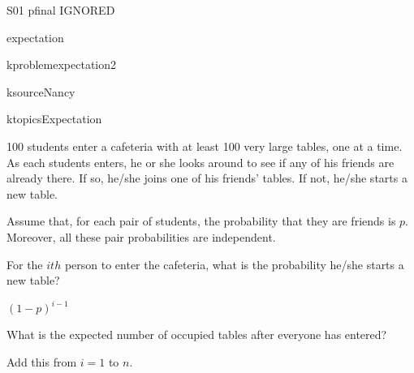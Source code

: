 \begin{problem}
\begin{staffnotes}
S01 pfinal IGNORED

expectation

kproblem{expectation2}

ksource{Nancy}

ktopics{Expectation}
\end{staffnotes}

100 students enter a cafeteria with at least 100 very large tables,
one at a time.  As each students enters, he or she looks around to see
if any of his friends are already there.  If so, he/she joins one of
his friends' tables.  If not, he/she starts a new table.

Assume that, for each pair of students, the probability that they are
friends is $p$.  Moreover, all these pair probabilities are
independent.

\bparts

\ppart For the $ith$ person to enter the cafeteria, what is
the probability he/she starts a new table?

\begin{solution}
$(1-p)^{i-1}$
\end{solution}

\ppart What is the expected number of occupied tables after
everyone has entered?

\begin{solution}
Add this from $i = 1$ to $n$.
\end{solution}
\eparts

\end{problem}

